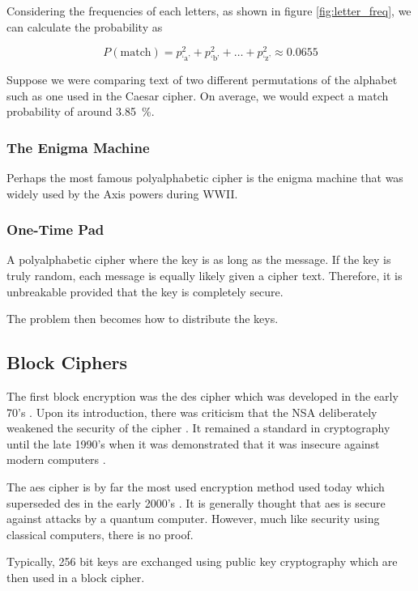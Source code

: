 Considering the frequencies of each letters, as shown in figure \ref{fig:letter_freq}, we can calculate the probability as

\begin{equation}
	P(\text{match}) = p_\text{`a'}^2 + p_\text{`b'}^2 + \dots +p_\text{`z'}^2 \approx 0.0655
\end{equation}

Suppose we were comparing text of two different permutations of the alphabet such as one used in the Caesar cipher. On average, we would expect a match probability of around \SI{3.85}{\percent}.

\subsubsection*{The Enigma Machine}

Perhaps the most famous polyalphabetic cipher is the enigma machine that was widely used by the Axis powers during WWII.

\subsubsection*{One-Time Pad}

A polyalphabetic cipher where the key is as long as the message. If the key is truly random, each message is equally likely given a cipher text. Therefore, it is unbreakable provided that the key is completely secure.

The problem then becomes how to distribute the keys.

\subsection{Block Ciphers}

The first block encryption was the \ac{des} cipher which was developed in the early 70's \cite{}. Upon its introduction, there was criticism that the NSA deliberately weakened the security of the cipher \cite{Diffie1977}. It remained a standard in cryptography until the late 1990's when it was demonstrated that it was insecure against modern computers \cite{}.

The \ac{aes} cipher is by far the most used encryption method used today which superseded \ac{des} in the early 2000's \cite{}. It is generally thought that \ac{aes} is secure against attacks by a quantum computer. However, much like security using classical computers, there is no proof.

Typically, 256 bit keys are exchanged using public key cryptography which are then used in a block cipher. 

